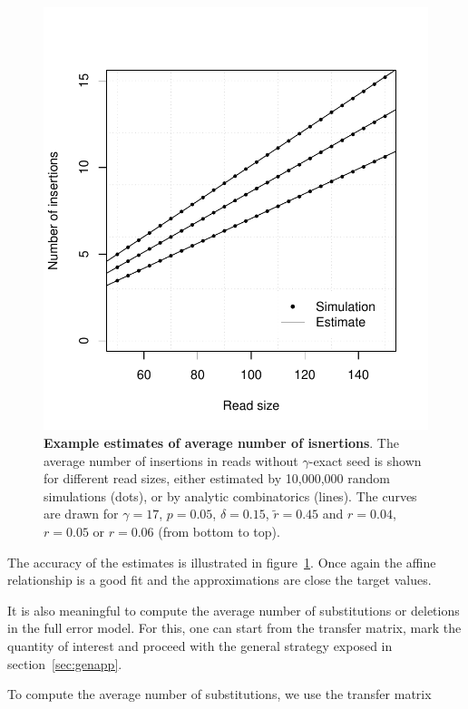 \documentclass{article}
\begin{document}
\begin{figure}[h]
\centering
\includegraphics[scale=0.445]{simulins-average.pdf}
\caption{\textbf{Example estimates of average number of isnertions}. The
average number of insertions in reads without $\gamma$-exact seed is
shown for different read sizes, either estimated by 10,000,000 random
simulations (dots), or by analytic combinatorics (lines). The curves are
drawn for $\gamma=17$, $p=0.05$, $\delta=0.15$, $\tilde{r}=0.45$ and
$r=0.04$, $r=0.05$ or $r=0.06$ (from bottom to top).}
\label{fig:simulavins}
\end{figure}

The accuracy of the estimates is illustrated in
figure~\ref{fig:simulavins}. Once again the affine relationship is a good
fit and the approximations are close the target values.

It is also meaningful to compute the average number of substitutions or
deletions in the full error model. For this, one can start from the
transfer matrix, mark the quantity of interest and proceed with the
general strategy exposed in section~\ref{sec:genapp}.

To compute the average number of substitutions, we use the transfer
matrix
\end{document}
